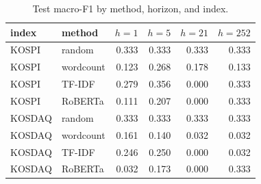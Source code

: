 \begin{table}[t]\centering
\caption{Test macro-F1 by method, horizon, and index.}
\begin{tabular}{llrrrr}
\toprule
index & method & $h{=}1$ & $h{=}5$ & $h{=}21$ & $h{=}252$ \\
\midrule
KOSPI & random & 0.333 & 0.333 & 0.333 & 0.333 \\
KOSPI & wordcount & 0.123 & 0.268 & 0.178 & 0.133 \\
KOSPI & TF-IDF & 0.279 & 0.356 & 0.000 & 0.333 \\
KOSPI & RoBERTa & 0.111 & 0.207 & 0.000 & 0.333 \\
\midrule
KOSDAQ & random & 0.333 & 0.333 & 0.333 & 0.333 \\
KOSDAQ & wordcount & 0.161 & 0.140 & 0.032 & 0.032 \\
KOSDAQ & TF-IDF & 0.246 & 0.250 & 0.000 & 0.032 \\
KOSDAQ & RoBERTa & 0.032 & 0.173 & 0.000 & 0.333 \\
\bottomrule
\end{tabular}
\end{table}
